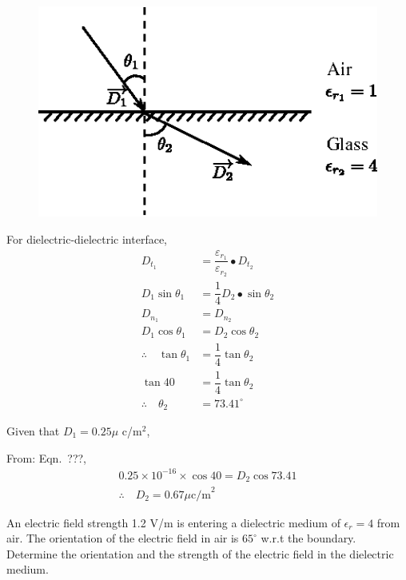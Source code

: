 \begin{solution}
~

\begin{figure}[H]
\centering
\includegraphics[scale=1.1]{images/fig4.eps}\label{chap27-fig4}
\end{figure}

For dielectric-dielectric interface,
\begin{align*}
D_{t_{1}} & = \dfrac{\varepsilon_{r_{1}}}{\varepsilon_{r_{2}}} \bullet D_{t_{2}}\\
D_{1} \sin \theta_{1} & = \dfrac{1}{4} D_{2} \bullet \sin \theta_{2}\\
D_{n_{1}} & = D_{n_{2}}\\
D_{1} \cos \theta_{1} & = D_{2} \cos \theta_{2}\\
\therefore\quad \tan \theta_{1} & = \dfrac{1}{4} \tan \theta_{2}\\
\tan 40 & = \dfrac{1}{4} \tan \theta_{2}\\
\therefore\quad \theta_{2} & = 73.41^{\circ}
\end{align*}

Given that $D_{1} = 0.25\mu$ c/m$^{2}$,

From: Eqn.~???, 
\begin{gather*}
0.25\times 10^{-16} \times \cos 40 = D_{2} \cos 73.41\\
\therefore\quad D_{2} = 0.67\mu \text{c/m}^{2}
\end{gather*}
\end{solution}

\begin{problem}
An electric field strength 1.2 V/m is entering a dielectric medium of $\epsilon_{r} = 4$ from air. The orientation of the electric field in air is $65^{\circ}$ w.r.t the boundary. Determine the orientation and the strength of the electric field in the dielectric medium. 
\end{problem}

